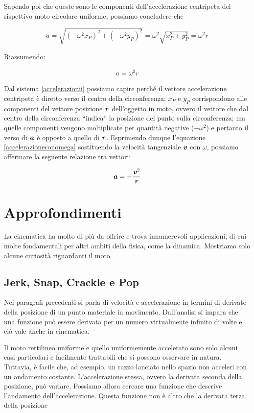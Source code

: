 \noindent Sapendo poi che queste sono le componenti dell'accelerazione
centripeta del rispettivo moto circolare uniforme, possiamo concludere
che

\[ a = \sqrt{(-\omega^2 x_P)^2 + (-\omega^2 y_P)^2} = \omega^2 \sqrt{x_P^2 + y_P^2} = \omega^2 r \]

\noindent Riassumendo:

\begin{align}
    a = \omega^2 r\label{accelerazioneconomega}
\end{align}

Dal sistema \ref{accelerazionii} possiamo capire perché il vettore
accelerazione centripeta è diretto verso il centro della circonferenza:
$x_P$ e $y_P$ corrispondono alle componenti del vettore posizione $\textbf{\textit{r}}$
dell'oggetto in moto, ovvero il vettore che dal centro della circonferenza
``indica'' la posizione del punto sulla circonferenza; ma quelle componenti
vengono moltiplicate per quantità negative ($-\omega^2$) e pertanto
il verso di $\textbf{\textit{a}}$ è opposto a quello di $\textbf{\textit{r}}$.
Esprimendo dunque l'equazione \ref{accelerazioneconomega} sostituendo
la velocità tangenziale $\textbf{\textit{v}}$ con $\omega$, possiamo affermare
la seguente relazione tra vettori:

\begin{align}
    \textbf{\textit{a}} = -\frac{\textbf{\textit{v}}^2}{\textbf{\textit{r}}}
\end{align}




\section{Approfondimenti}
La cinematica ha molto di più da offrire e trova innumerevoli applicazioni,
di cui molte fondamentali per altri ambiti della fisica, come la dinamica.
Mostriamo solo alcune curiosità riguardanti il moto.

\subsection{Jerk, Snap, Crackle e Pop}
Nei paragrafi precedenti si parla di velocità e accelerazione in termini
di derivate della posizione di un punto materiale in movimento. Dall'analisi
si impara che una funzione può essere derivata per un numero virtualmente
infinito di volte e ciò vale anche in cinematica.

Il moto rettilineo uniforme e quello uniformemente accelerato sono solo
alcuni casi particolari e facilmente trattabili che si possono osservare
in natura. Tuttavia, è facile che, ad esempio, un razzo lanciato nello
spazio non acceleri con un andamento costante. L'accelerazione stessa,
ovvero la derivata seconda della posizione, può variare. Possiamo allora
cercare una funzione che descrive l'andamento dell'accelerazione. Questa funzione
non è altro che la derivata terza della posizione



